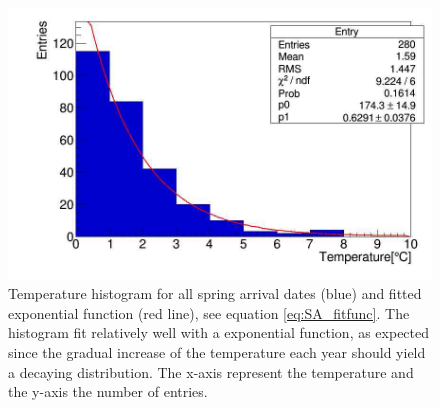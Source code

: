 \documentclass[a4paper,12pt]{article}
\begin{document}
\begin{figure}[htb]
	\centering
	\includegraphics[scale=.4]{../Code/springArrive_tempHist.jpg}
	\caption{Temperature histogram for all spring arrival dates (blue) and 
	fitted exponential function (red line), see equation 
	\eqref{eq:SA_fitfunc}. The histogram fit relatively well with a 
	exponential function, as expected since the gradual increase of the 
	temperature each year should yield a decaying distribution. The 
	x-axis represent the temperature and the y-axis the number of 
	entries.}
	\label{fig:SA_tempHist}
\end{figure}
\end{document}
